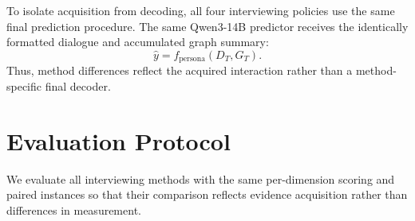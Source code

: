 \documentclass{ieeeaccess}
\begin{document}
To isolate acquisition from decoding, all four interviewing policies use the same final
prediction procedure. The same Qwen3-14B predictor receives the identically formatted
dialogue and accumulated graph summary:
\begin{equation}
\hat{y}=f_{\mathrm{persona}}(D_T,G_T).
\label{eq:final_persona}
\end{equation}
Thus, method differences reflect the acquired interaction rather than a method-specific
final decoder.






\section{Evaluation Protocol}
\label{sec:evaluation}
We evaluate all interviewing methods with the same per-dimension scoring and paired
instances so that their comparison reflects evidence acquisition rather than differences
in measurement.
\end{document}
